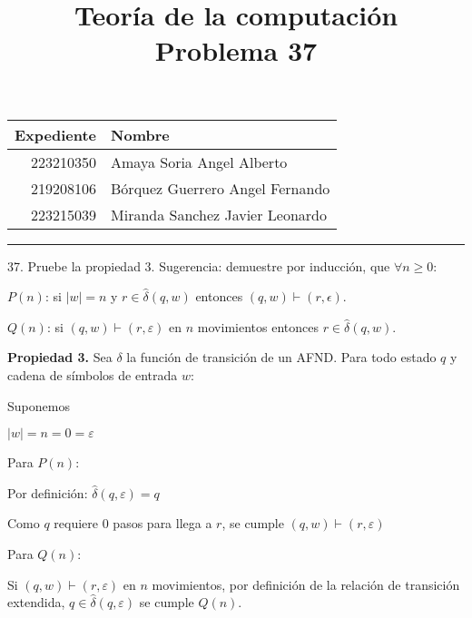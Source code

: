 \documentclass[a4paper, 12pt]{article}
\title
{
  Teoría de la computación \\
  Problema 37
}
\begin{document}
\maketitle

\begin{center}
    \begin{tabular}{r|l}
        \textbf{Expediente} & \textbf{Nombre} \\ \hline
        223210350 & Amaya Soria Angel Alberto \\
        219208106 & Bórquez Guerrero Angel Fernando \\
        223215039 & Miranda Sanchez Javier Leonardo \\
    \end{tabular}
\end{center}

\rule{\linewidth}{0.3mm}

\vspace{0.3cm}

37. Pruebe la propiedad 3. Sugerencia: demuestre por inducción, que $\forall n \geq 0$:

\par $P(n)$: si $|w| = n$ y $r \in \hat{\delta}(q, w)$ entonces $(q, w) \vdash (r, \epsilon)$.
\par $Q(n)$: si $(q, w) \vdash (r, \varepsilon)$ en $n$ movimientos entonces $r \in \hat{\delta}(q, w)$.

\vspace{0.5cm}
\par \textbf {Propiedad 3.} Sea $\delta$ la función de transición de un AFND. Para todo estado $q$ y cadena de símbolos de entrada $w$:
\begin{center}
    \par {}
\end{center}

\par { \large \color{azul} Suponemos}
\par $|w| = n = 0 = \varepsilon$
\par Para $P(n)$:
\par Por definición: $\hat{\delta}(q, \varepsilon) = q$
\par Como $q$ requiere 0 pasos para llega a $r$, se cumple $(q, w) \vdash (r, \varepsilon)$
\vspace{0.2cm}
\par Para $Q(n)$:
\par Si $(q, w) \vdash (r, \varepsilon)$ en $n$ movimientos, por definición de la relación de transición extendida, $q \in \hat{\delta}(q, \varepsilon)$ se cumple $Q(n)$.
\end{document}
